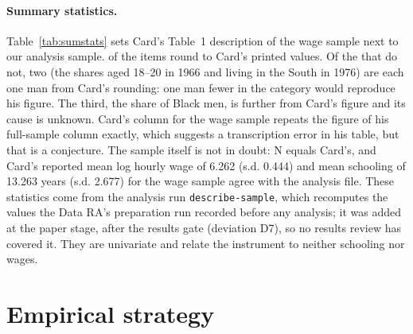 \documentclass[11pt]{article}
\newcommand{\var}[1]{\texttt{#1}}
\begin{document}
\paragraph{Summary statistics.} Table~\ref{tab:sumstats} sets Card's Table~1 description
of the wage sample next to our analysis sample. \TOneRoundsOk{} of the \TOneItems{} items
round to Card's printed values. Of the \TOneMisses{} that do not, two (the shares aged
18--20 in 1966 and living in the South in 1976) are each one man from Card's rounding: one
man fewer in the category would reproduce his figure. The third, the share of Black men,
is further from Card's figure and its cause is unknown. Card's column for the wage sample
repeats the figure of his full-sample column exactly, which suggests a transcription error
in his table, but that is a conjecture. The sample itself is not in doubt: N equals Card's,
and Card's reported mean log hourly wage of 6.262 (s.d. 0.444) and mean schooling of %
13.263 years (s.d. 2.677) for the wage sample \citep[Tables~2--3 notes]{card1993nber} %
agree with the analysis file. These statistics come from the analysis run
\var{describe-sample}, which recomputes the values the Data RA's preparation run recorded
before any analysis; it was added at the paper stage, after the results gate (deviation
D7), so no results review has covered it. They are univariate and relate the instrument to
neither schooling nor wages.



\section{Empirical strategy}
\label{sec:strategy}
\end{document}
